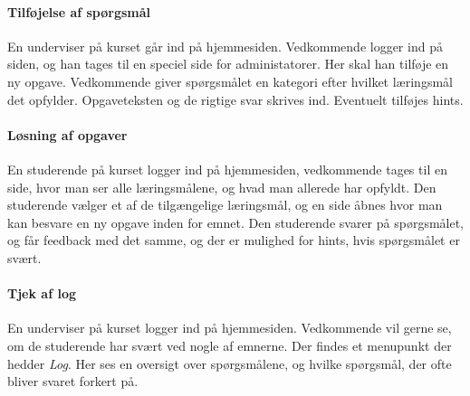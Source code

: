 \documentclass[12pt]{article}
\begin{document}
\paragraph{Tilføjelse af spørgsmål}
En underviser på kurset går ind på hjemmesiden. Vedkommende logger ind på siden, og han tages til en speciel side for administatorer.
Her skal han tilføje en ny opgave. Vedkommende giver spørgsmålet en kategori efter hvilket læringsmål det opfylder. Opgaveteksten og de rigtige svar skrives ind. Eventuelt tilføjes hints.

\paragraph{Løsning af opgaver}
En studerende på kurset logger ind på hjemmesiden, vedkommende tages til en side, hvor man ser alle læringsmålene, og hvad man allerede har opfyldt. Den studerende vælger et af de tilgængelige læringsmål, og en side åbnes hvor man kan besvare en ny opgave inden for emnet. Den studerende svarer på spørgsmålet, og får feedback med det samme, og der er mulighed for hints, hvis spørgsmålet er svært.

\paragraph{Tjek af log}
En underviser på kurset logger ind på hjemmesiden. Vedkommende vil gerne se, om de studerende har svært ved nogle af emnerne. Der findes et menupunkt der hedder \emph{Log}. Her ses en oversigt over spørgsmålene, og hvilke spørgsmål, der ofte bliver svaret forkert på.
\end{document}
